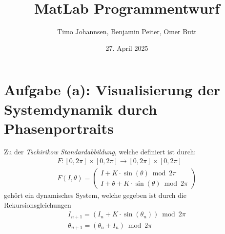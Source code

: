 \documentclass[paper=a4, 
                DIV=12]{scrartcl}
\title{MatLab Programmentwurf}
\author{Timo Johannsen, Benjamin Peiter, Omer Butt}
\date{27. April 2025}
\begin{document}
\maketitle
\newpage
\tableofcontents
\newpage

\section{Aufgabe (a): Visualisierung der Systemdynamik durch Phasenportraits}
Zu der \textit{Tschirikow Standardabbildung}, welche definiert ist durch:
\begin{gather*}
    F: [0,2\pi] \times [0,2\pi] \to [0,2\pi] \times [0,2\pi] \\
    F(I, \theta) = 
    \begin{pmatrix}
        I + K \cdot \sin(\theta) \bmod 2\pi \\
        I + \theta + K \cdot \sin(\theta) \bmod 2\pi
    \end{pmatrix}
\end{gather*}
gehört ein dynamisches System, welche gegeben ist durch die Rekursionsgleichungen
\begin{gather*}
    I_{n+1} = (I_n + K \cdot \sin(\theta_n)) \bmod 2\pi \\
    \theta_{n+1} = (\theta_n + I_n) \bmod 2\pi
\end{gather*}
\end{document}
